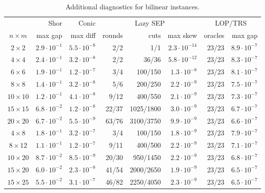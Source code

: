 \documentclass[11pt]{article}
\begin{document}
\begin{table}[htbp]
\centering
\caption{Additional diagnostics for bilinear instances.}
\label{tab:bilinear_diagnostics}
\begingroup
\setlength{\tabcolsep}{2.5pt}
\scriptsize
\begin{tabular}{c|r|r|r r r|r r}
\hline
& Shor & Conic & \multicolumn{3}{c|}{Lazy SEP} & \multicolumn{2}{c}{LOP/TRS} \\
$n\times m$ & max gap & max diff & rounds & cuts & max skew & oracles & max gap \\
\hline
$2\times 2$ & $2.9\cdot 10^{-1}$ & $5.5\cdot 10^{-8}$ & 2/2 & 1/1 & $2.3\cdot 10^{-14}$ & 23/23 & $8.9\cdot 10^{-7}$ \\
$4\times 4$ & $2.4\cdot 10^{-1}$ & $3.2\cdot 10^{-8}$ & 2/2 & 36/36 & $5.8\cdot 10^{-12}$ & 23/23 & $8.3\cdot 10^{-7}$ \\
$6\times 6$ & $1.9\cdot 10^{-1}$ & $1.2\cdot 10^{-7}$ & 3/4 & 100/150 & $1.3\cdot 10^{-8}$ & 23/23 & $8.1\cdot 10^{-7}$ \\
$8\times 8$ & $1.4\cdot 10^{-1}$ & $3.2\cdot 10^{-8}$ & 5/6 & 200/250 & $2.2\cdot 10^{-9}$ & 23/23 & $7.5\cdot 10^{-7}$ \\
$10\times 10$ & $1.2\cdot 10^{-1}$ & $4.1\cdot 10^{-8}$ & 9/12 & 400/550 & $2.1\cdot 10^{-9}$ & 23/23 & $7.3\cdot 10^{-7}$ \\
$15\times 15$ & $6.8\cdot 10^{-2}$ & $1.2\cdot 10^{-8}$ & 22/37 & 1025/1800 & $3.0\cdot 10^{-9}$ & 23/23 & $6.7\cdot 10^{-7}$ \\
$20\times 20$ & $6.7\cdot 10^{-2}$ & $5.5\cdot 10^{-9}$ & 63/76 & 3100/3750 & $9.9\cdot 10^{-9}$ & 23/23 & $6.6\cdot 10^{-7}$ \\
\hline
$4\times 8$ & $1.8\cdot 10^{-1}$ & $3.2\cdot 10^{-7}$ & 3/4 & 100/150 & $1.8\cdot 10^{-9}$ & 23/23 & $7.9\cdot 10^{-7}$ \\
$8\times 12$ & $1.1\cdot 10^{-1}$ & $1.2\cdot 10^{-7}$ & 9/11 & 400/500 & $2.2\cdot 10^{-9}$ & 23/23 & $7.1\cdot 10^{-7}$ \\
$10\times 20$ & $8.7\cdot 10^{-2}$ & $8.5\cdot 10^{-9}$ & 20/30 & 950/1450 & $2.2\cdot 10^{-9}$ & 23/23 & $6.8\cdot 10^{-7}$ \\
$15\times 20$ & $6.0\cdot 10^{-2}$ & $2.3\cdot 10^{-8}$ & 41/54 & 2000/2650 & $1.9\cdot 10^{-9}$ & 23/23 & $6.5\cdot 10^{-7}$ \\
$15\times 25$ & $5.5\cdot 10^{-2}$ & $3.1\cdot 10^{-7}$ & 46/82 & 2250/4050 & $2.3\cdot 10^{-9}$ & 23/23 & $6.5\cdot 10^{-7}$ \\
\hline
\hline
\end{tabular}
\endgroup
\end{table}
\end{document}
